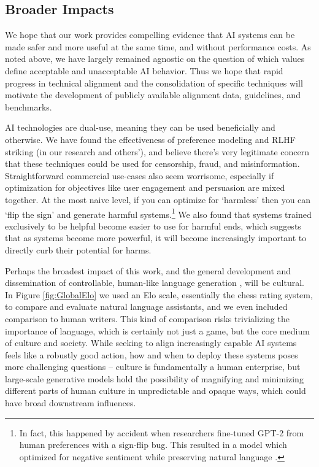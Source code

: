 \subsection{Broader Impacts}

We hope that our work provides compelling evidence that AI systems can be made safer and more useful at the same time, and without performance costs.   As noted above, we have largely remained agnostic on the question of which values define acceptable and unacceptable AI behavior.  Thus we hope that  rapid progress in technical alignment and the consolidation of specific techniques will motivate the development of publicly available alignment data, guidelines, and benchmarks.

AI technologies are dual-use, meaning they can be used beneficially and otherwise.  We have found the effectiveness of preference modeling and RLHF striking (in our research and others'), and believe there's very legitimate concern that these techniques could be used for censorship, fraud, and misinformation.  Straightforward commercial use-cases also seem worrisome, especially if optimization for objectives like user engagement and persuasion are mixed together.  At the most naive level, if you can optimize for `harmless' then you can `flip the sign' and generate harmful systems.\footnote{In fact, this happened by accident when researchers fine-tuned GPT-2 from human preferences with a sign-flip bug. This resulted in a model which optimized for negative sentiment while preserving natural language \cite{ziegler_fine-tuning_2019}.}  We also found that systems trained exclusively to be helpful become easier to use for harmful ends, which suggests that as systems become more powerful, it will become increasingly important to directly  curb their potential for harms.  

Perhaps the broadest impact of this work, and the general development and dissemination of controllable, human-like language generation \cite{PredictabilitySurprise}, will be cultural.  In Figure \ref{fig:GlobalElo} we used an Elo scale, essentially the chess rating system, to compare and evaluate natural language assistants, and we even included comparison to human writers.  This kind of comparison risks trivializing the importance of language, which is certainly not just a game, but the core medium of culture and society.  While  seeking to align increasingly capable AI systems feels like a robustly good action, how and when to deploy these systems poses more challenging questions -- culture is fundamentally a human enterprise, but large-scale generative models hold the possibility of magnifying and minimizing different parts of human culture in unpredictable and opaque ways, which could have broad downstream influences.


